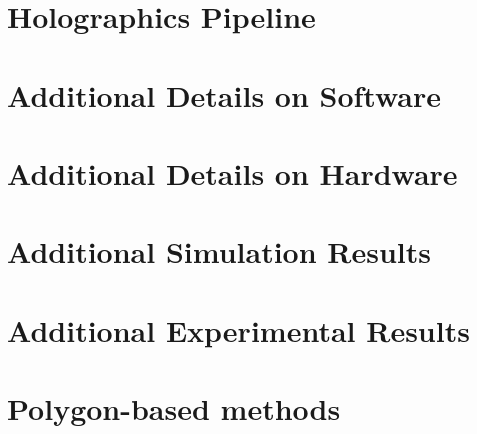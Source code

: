 \documentclass[acmtog,nonacm]{acmart}
\begin{document}
\maketitle


\section{Holographics Pipeline}
\label{sec:holographics}


\clearpage
\newpage
\section{Additional Details on Software}
\label{sec:software}

% 


\clearpage
\newpage
\section{Additional Details on Hardware}
\label{sec:hardware}


\section{Additional Simulation Results}
\label{sec:simulation}



\clearpage
\newpage
\section{Additional Experimental Results}
\label{sec:experiments}


\clearpage
\newpage
\section{Polygon-based methods}
\label{sec:misc}

\end{document}
